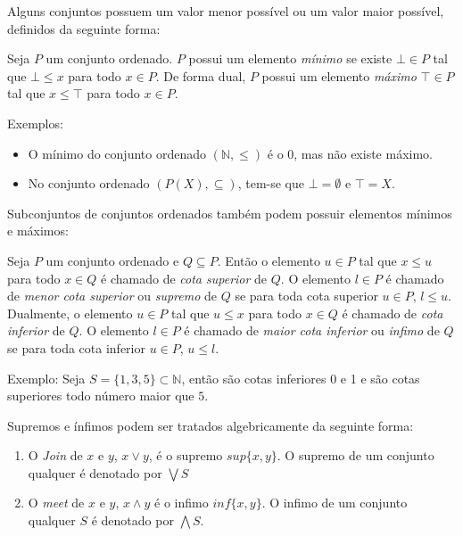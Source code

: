 \documentclass[../main.tex]{subfiles}
\begin{document}
Alguns conjuntos possuem um valor menor possível ou um valor maior possível, definidos da seguinte forma:

\begin{definition}
    Seja $P$ um conjunto ordenado. $P$ possui um elemento \emph{mínimo} se existe $\bot \in P$ tal que $\bot \leq x$ para todo $x \in P$. De forma dual, $P$ possui um elemento \emph{máximo} $\top \in P$ tal que $x \leq \top$ para todo $x \in P$.
\end{definition}

Exemplos:
\begin{itemize}
    \item O mínimo do conjunto ordenado $(\mathbb{N}, \leq)$ é o $0$, mas não existe máximo.
    \item No conjunto ordenado $(P(X), \subseteq)$, tem-se que $\bot = \emptyset$ e $\top = X$. 
\end{itemize}

Subconjuntos de conjuntos ordenados também podem possuir elementos mínimos e máximos:

\begin{definition}
    Seja $P$ um conjunto ordenado e $Q \subseteq P$. Então o elemento $u \in P$ tal que $x \leq u$ para todo $x \in Q$ é chamado de \emph{cota superior} de $Q$. O elemento $l \in P$ é chamado de \emph{menor cota superior} ou \emph{supremo} de $Q$ se para toda cota superior $u \in P$, $l \leq u$. \\
    Dualmente, o elemento $u \in P$ tal que $u \leq x$ para todo $x \in Q$ é chamado de \emph{cota inferior} de $Q$. O elemento $l \in P$ é chamado de \emph{maior cota inferior} ou \emph{infimo} de $Q$ se para toda cota inferior $u \in P$, $u \leq l$.
\end{definition}


Exemplo: Seja $S = \{ 1, 3, 5\} \subset \mathbb{N}$, então são cotas inferiores 0 e 1 e são cotas superiores todo número maior que $5$.

Supremos e ínfimos podem ser tratados algebricamente da seguinte forma:

\begin{definition}
    \hfill
    \begin{enumerate}
        \item O \emph{Join} de $x$ e $y$, $x \vee y$, é o supremo $sup\{x, y\}$. O supremo de um conjunto qualquer é denotado por $\bigvee S$
        \item O \emph{meet} de $x$ e $y$, $ x \land y$ é o infimo $inf\{x, y\}$. O infimo de um conjunto qualquer $S$ é denotado por $\bigwedge S$. 
    \end{enumerate}
\end{definition}
\end{document}
